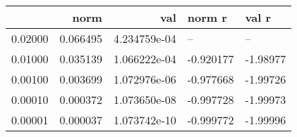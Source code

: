 \begin{tabular}{lrrll}
\toprule
{} &      norm &           val &    norm r &    val r \\
\midrule
0.02000 &  0.066495 &  4.234759e-04 &        -- &       -- \\
0.01000 &  0.035139 &  1.066222e-04 & -0.920177 & -1.98977 \\
0.00100 &  0.003699 &  1.072976e-06 & -0.977668 & -1.99726 \\
0.00010 &  0.000372 &  1.073650e-08 & -0.997728 & -1.99973 \\
0.00001 &  0.000037 &  1.073742e-10 & -0.999772 & -1.99996 \\
\bottomrule
\end{tabular}
